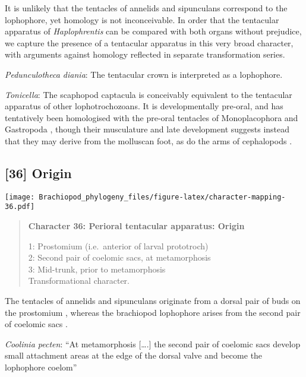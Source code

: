 \documentclass[openany]{book}
\theoremstyle{definition}
\theoremstyle{definition}
\theoremstyle{definition}
\theoremstyle{remark}
\begin{document}
It is unlikely that the tentacles of annelids and sipunculans correspond
to the lophophore, yet homology is not inconceivable. In order that the
tentacular apparatus of \emph{Haplophrentis} can be compared with both
organs without prejudice, we capture the presence of a tentacular
apparatus in this very broad character, with arguments against homology
reflected in separate transformation series.

\hypertarget{Pedunculotheca_diania-coding-35}{}
\emph{Pedunculotheca diania}: The tentacular crown \citep{Zhang2013} is
interpreted as a lophophore.

\hypertarget{Tonicella-coding-35}{}
\emph{Tonicella}: The scaphopod captacula is conceivably equivalent to
the tentacular apparatus of other lophotrochozoans. It is
developmentally pre-oral, and has tentatively been homologised with the
pre-oral tentacles of Monoplacophora and Gastropoda \citep{Steiner1992},
though their musculature and late development suggests instead that they
may derive from the molluscan foot, as do the arms of cephalopods
\citep{Wanninger2002M}.

\subsection*{{[}36{]} Origin}\label{origin}

\texttt{[image: Brachiopod\_phylogeny\_files/figure-latex/character-mapping-36.pdf]}

\begin{quote}
\textbf{Character 36: Perioral tentacular apparatus: Origin}

1: Prostomium (i.e.~anterior of larval prototroch)\\
2: Second pair of coelomic sacs, at metamorphosis\\
3: Mid-trunk, prior to metamorphosis\\
Transformational character.
\end{quote}

The tentacles of annelids and sipunculans originate from a dorsal pair
of buds on the prostomium \citep{Adrianov2006}, whereas the brachiopod
lophophore arises from the second pair of coelomic sacs
\citep{Nielsen1991}.

\hypertarget{Coolinia_pecten-coding-36}{}
\emph{Coolinia pecten}: ``At metamorphosis {[}\ldots{}.{]} the second
pair of coelomic sacs develop small attachment areas at the edge of the
dorsal valve and become the lophophore coelom'' \citep{Nielsen1991}
\end{document}

